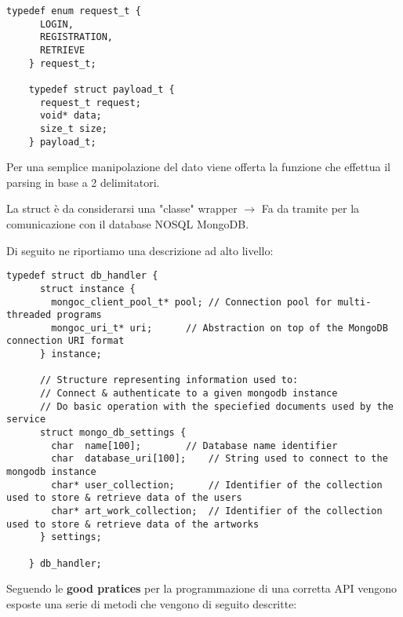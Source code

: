   \begin{lstlisting}[language={[POSIX]C}, style=wnumbers]
    typedef enum request_t {
      LOGIN,
      REGISTRATION,
      RETRIEVE
    } request_t;

    typedef struct payload_t {
      request_t request;
      void* data;
      size_t size;
    } payload_t;
  \end{lstlisting}

  Per una semplice manipolazione del dato viene offerta la funzione  che effettua il parsing in base a 2 delimitatori.

  \begin{center}  \end{center}

  La struct  è da considerarsi una "classe" wrapper \footnotemark {} $\rightarrow$ Fa da tramite per la comunicazione con il database NOSQL MongoDB.

  Di seguito ne riportiamo una descrizione ad alto livello:

  \begin{lstlisting}[language={[POSIX]C}, style=wnumbers]
    typedef struct db_handler {
      struct instance {
        mongoc_client_pool_t* pool;	// Connection pool for multi-threaded programs
        mongoc_uri_t* uri;		// Abstraction on top of the MongoDB connection URI format
      } instance;

      // Structure representing information used to:
      // Connect & authenticate to a given mongodb instance
      // Do basic operation with the speciefied documents used by the service
      struct mongo_db_settings {
        char  name[100];		// Database name identifier
        char  database_uri[100];	// String used to connect to the mongodb instance
        char* user_collection;		// Identifier of the collection used to store & retrieve data of the users
        char* art_work_collection;	// Identifier of the collection used to store & retrieve data of the artworks
      } settings;

    } db_handler;

  \end{lstlisting}
  Seguendo le \textbf{good pratices} per la programmazione di una corretta API vengono esposte una serie di metodi che vengono di seguito descritte:

